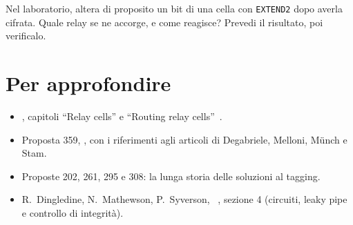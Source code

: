 \begin{esercizio}[3]\label{es:10-alterazione}
Nel laboratorio, altera di proposito un bit di una cella  con \texttt{EXTEND2} dopo averla cifrata. Quale relay se ne accorge, e come reagisce? Prevedi il risultato, poi verificalo.
\end{esercizio}

\section*{Per approfondire}
\begin{itemize}
  \item {}, capitoli \enquote{Relay cells} e \enquote{Routing relay cells}~\cite{torspec}.
  \item Proposta 359, , con i riferimenti agli articoli di Degabriele, Melloni, Münch e Stam.
  \item Proposte 202, 261, 295 e 308: la lunga storia delle soluzioni al tagging.
  \item R.~Dingledine, N.~Mathewson, P.~Syverson, ~\cite{dingledine2004tor}, sezione 4 (circuiti, leaky pipe e controllo di integrità).
\end{itemize}
